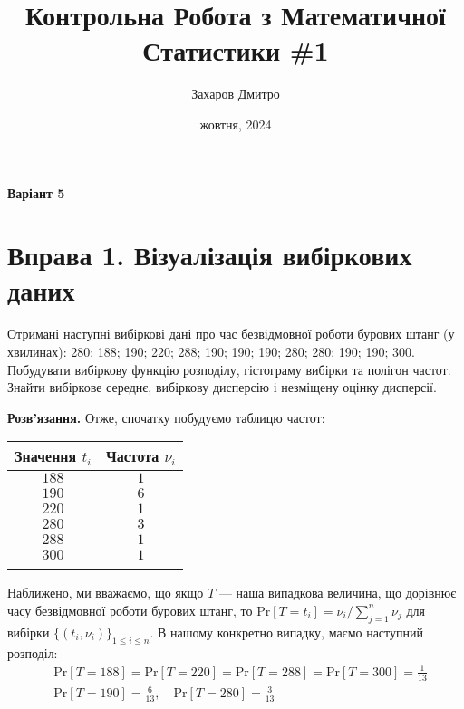 \documentclass{../hw_template}
\title{\huge\sffamily\bfseries Контрольна Робота з Математичної Статистики \#1}
\author{\Large\sffamily Захаров Дмитро}
\date{\sffamily 26 жовтня, 2024}
\begin{document}
\pagestyle{fancy}

\maketitle

\begin{center}
    \textbf{Варіант 5}
\end{center}

\tableofcontents

\pagebreak

\section{Вправа 1. Візуалізація вибіркових даних}

\begin{problems}
    Отримані наступні вибіркові дані про час безвідмовної роботи бурових 
    штанг (у хвилинах): 280; 188; 190; 220; 288; 190; 190; 190; 280; 280; 190; 190;
300. Побудувати вибіркову функцію розподілу, гістограму вибірки та полігон
частот. Знайти вибіркове середнє, вибіркову дисперсію і незміщену оцінку
дисперсії.
\end{problems}

\textbf{Розв'язання.} Отже, спочатку побудуємо таблицю частот:

\begin{table}[H]
    \centering
    \begin{tabular}{c|c}
        \Xhline{3\arrayrulewidth}
        \textbf{Значення $t_i$} & \textbf{Частота} $\nu_i$ \\
        \hline
        $188$ & $1$ \\
        $190$ & $6$ \\
        $220$ & $1$ \\
        $280$ & $3$ \\
        $288$ & $1$ \\
        $300$ & $1$ \\
        \Xhline{3\arrayrulewidth}
    \end{tabular}
\end{table}

Наближено, ми вважаємо, що якщо $T$ --- наша випадкова величина, що дорівнює часу безвідмовної роботи бурових штанг, то $\text{Pr}[T=t_i] = \nu_i/\sum_{j=1}^n \nu_j$ для вибірки $\{(t_i,\nu_i)\}_{1 \leq i \leq n}$. В нашому конкретно випадку, маємо наступний розподіл:
\begin{align*}
    &\text{Pr}[T=188] = \text{Pr}[T=220] = \text{Pr}[T=288] = \text{Pr}[T=300] = \frac{1}{13}\\
    &\text{Pr}[T=190] = \frac{6}{13}, \quad \text{Pr}[T=280] = \frac{3}{13}
\end{align*}
\end{document}
